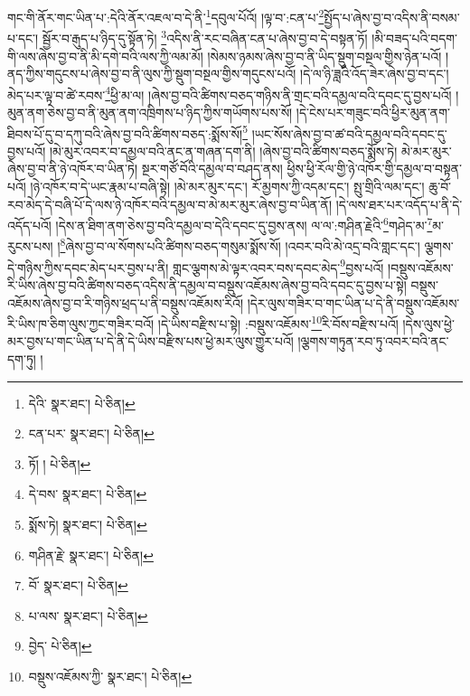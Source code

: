 གང་གི་ནོར་གང་ཡིན་པ་:དེའི་ནོར་འཇལ་བ་དེ་ནི་\footnote{དེའི་  སྣར་ཐང་།  པེ་ཅིན། }དབུལ་པོའོ། །ལྟ་བ་:ངན་པ་\footnote{ངན་པར་  སྣར་ཐང་།  པེ་ཅིན། }སྤྱོད་པ་ཞེས་བྱ་བ་འདིས་ནི་བསམ་པ་དང་། སྦྱོར་བ་རྒུད་པ་ཉིད་དུ་སྟོན་ཏེ། \footnote{ཏོ། །   པེ་ཅིན། }འདིས་ནི་རང་བཞིན་ངན་པ་ཞེས་བྱ་བ་དེ་བསྟན་ཏོ། །མི་བཟད་པའི་བདག་གི་ལས་ཞེས་བྱ་བ་ནི་མི་དགེ་བའི་ལས་ཀྱི་ལམ་མོ། །སེམས་ཉམས་ཞེས་བྱ་བ་ནི་ཡིད་སྡུག་བསྔལ་གྱིས་ཉེན་པའོ། །ནད་ཀྱིས་གདུངས་པ་ཞེས་བྱ་བ་ནི་ལུས་ཀྱི་སྡུག་བསྔལ་གྱིས་གདུངས་པའོ། །དེ་ལ་ཉི་ཟླའི་འོད་ཟེར་ཞེས་བྱ་བ་དང་། མེད་པར་ལྟ་བ་ཚེ་རབས་\footnote{དེ་བས་  སྣར་ཐང་།  པེ་ཅིན། }ཕྱི་མ་ལ། །ཞེས་བྱ་བའི་ཚིགས་བཅད་གཉིས་ནི་གྲང་བའི་དམྱལ་བའི་དབང་དུ་བྱས་པའོ། །མུན་ནག་ཅེས་བྱ་བ་ནི་མུན་ནག་འཁྲིགས་པ་ཉིད་ཀྱིས་གཡོགས་པས་སོ། །དེ་ངེས་པར་གཟུང་བའི་ཕྱིར་མུན་ནག་ཐིབས་པོ་དུ་བ་དཀུ་བའི་ཞེས་བྱ་བའི་ཚིགས་བཅད་:སྨོས་སོ།\footnote{སྨོས་ཏེ།  སྣར་ཐང་།  པེ་ཅིན། } །ཡང་སོས་ཞེས་བྱ་བ་ཚ་བའི་དམྱལ་བའི་དབང་དུ་བྱས་པའོ། །མེ་མུར་འབར་བ་དམྱལ་བའི་ནང་ན་གཞན་དག་ནི། །ཞེས་བྱ་བའི་ཚིགས་བཅད་སྨོས་ཏེ། མེ་མར་མུར་ཞེས་བྱ་བ་ནི་ཉེ་འཁོར་བ་ཡིན་ཏེ། སྔར་གཙོ་བོའི་དམྱལ་བ་བཤད་ནས། ཕྱིས་ཕྱི་རོལ་གྱི་ཉེ་འཁོར་གྱི་དམྱལ་བ་བསྟན་པའོ། །ཉེ་འཁོར་བ་དེ་ཡང་རྣམ་པ་བཞི་སྟེ། །མེ་མར་མུར་དང་། རོ་མྱགས་ཀྱི་འདམ་དང་། སྤུ་གྲིའི་ལམ་དང་། ཆུ་བོ་རབ་མེད་དེ་བཞི་པོ་དེ་ལས་ཉེ་འཁོར་བའི་དམྱལ་བ་མེ་མར་མུར་ཞེས་བྱ་བ་ཡིན་ནོ། །དེ་ལས་ཐར་པར་འདོད་པ་ནི་དེ་འདོད་པའོ། །དེས་ན་ཐིག་ནག་ཅེས་བྱ་བའི་དམྱལ་བ་དེའི་དབང་དུ་བྱས་ནས། ལ་ལ་:གཤིན་རྗེའི་\footnote{གཤིན་རྗེ་  སྣར་ཐང་།  པེ་ཅིན། }གཤེད་མ་\footnote{བོ་  སྣར་ཐང་།  པེ་ཅིན། }མ་རུངས་པས། །\footnote{པ་ལས་  སྣར་ཐང་།  པེ་ཅིན། }ཞེས་བྱ་བ་ལ་སོགས་པའི་ཚིགས་བཅད་གསུམ་སྨོས་སོ། །འབར་བའི་མེ་འདྲ་བའི་གླང་དང་། ལྕགས་དེ་གཉིས་ཀྱིས་དབང་མེད་པར་བྱས་པ་ནི། གླང་ལྕགས་མེ་ལྟར་འབར་བས་དབང་མེད་\footnote{བྱེད་  པེ་ཅིན། }བྱས་པའོ། །བསྡུས་འཇོམས་རི་ཡིས་ཞེས་བྱ་བའི་ཚིགས་བཅད་འདིས་ནི་དམྱལ་བ་བསྡུས་འཇོམས་ཞེས་བྱ་བའི་དབང་དུ་བྱས་པ་སྟེ། བསྡུས་འཇོམས་ཞེས་བྱ་བ་རི་གཉིས་ཕྲད་པ་ནི་བསྡུས་འཇོམས་རིའོ། །དེར་ལུས་གཟིར་བ་གང་ཡིན་པ་དེ་ནི་བསྡུས་འཇོམས་རི་ཡིས་ཁ་ཅིག་ལུས་ཀྱང་གཟིར་བའོ། །དེ་ཡིས་བརྫིས་པ་སྟེ། :བསྡུས་འཇོམས་\footnote{བསྡུས་འཇོམས་ཀྱི་  སྣར་ཐང་།  པེ་ཅིན། }རི་བོས་བརྫིས་པའོ། །དེས་ལུས་ཕྱེ་མར་བྱས་པ་གང་ཡིན་པ་དེ་ནི་དེ་ཡིས་བརྫིས་པས་ཕྱེ་མར་ལུས་གྱུར་པའོ། །ལྕགས་གཏུན་རབ་ཏུ་འབར་བའི་ནང་དག་ཏུ། །
